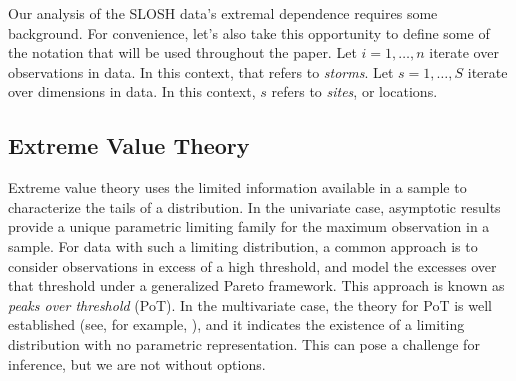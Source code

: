 Our analysis of the SLOSH data's extremal dependence requires some background.  
      For 
    convenience, let's also take this opportunity to define some of the notation 
    that will be used throughout the paper.  Let $i = 1,\ldots,n$ iterate over 
    observations in data.  In this context, that refers to \emph{storms}.
    Let $s = 1,\ldots,S$  iterate over dimensions in data.  In this context, 
    $s$ refers to \emph{sites}, or locations.

\subsection{Extreme Value Theory\label{ref:evt}}
Extreme value theory uses the limited information available in a sample to
    characterize the tails of a distribution.  In the univariate case, asymptotic
    results provide a unique parametric limiting family for the maximum observation
    in a sample.  For data with such a limiting distribution, a common approach
    is to consider observations in excess of a high threshold, and model the
    excesses over that threshold under a generalized Pareto framework.  This
    approach is known as \emph{peaks over threshold} (PoT).  In the multivariate 
    case, the theory for PoT is well established (see, for example, 
    \cite{dehaan2006}), and it indicates the existence of a limiting distribution
    with no parametric representation.  This can pose a challenge for inference,
    but we are not without options.

